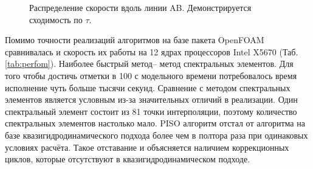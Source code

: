 \begin{figure}
    \centering
    \caption{Распределение скорости вдоль линии AB. Демонстрируется сходимость по $\tau$.}
    \label{fig:tauAttr}
\end{figure}

Помимо точности реализаций алгоритмов на базе пакета OpenFOAM сравнивалась и скорость их работы на 12 ядрах процессоров Intel X5670 (Таб. \ref{tab:perfom}). Наиболее быстрый метод– метод спектральных элементов. Для того чтобы достичь отметки в 100 с модельного времени потребовалось время исполнение чуть больше тысячи секунд. Сравнение с методом спектральных элементов является условным из-за значительных отличий в реализации. Один спектральный элемент состоит из 81 точки интерполяции, поэтому количество спектральных элементов настолько мало. PISO алгоритм отстал от алгоритма на базе квазигидродинамического подхода более чем в полтора раза при одинаковых условиях расчёта. Такое отставание и объясняется наличием коррекционных циклов, которые отсутствуют в квазигидродинамическом подходе. 

